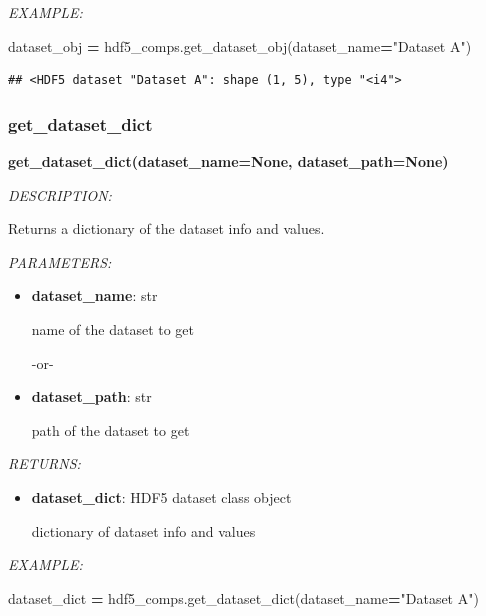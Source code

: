 \documentclass[
]{article}
\newenvironment{Shaded}{\begin{snugshade}}{\end{snugshade}}
\newcommand{\NormalTok}[1]{#1}
\newcommand{\OperatorTok}[1]{\textcolor[rgb]{0.81,0.36,0.00}{\textbf{#1}}}
\newcommand{\StringTok}[1]{\textcolor[rgb]{0.31,0.60,0.02}{#1}}
\begin{document}
\emph{EXAMPLE:}

\begin{Shaded}
\begin{Highlighting}[]
\NormalTok{dataset_obj }\OperatorTok{=}\NormalTok{ hdf5_comps.get_dataset_obj(dataset_name}\OperatorTok{=}\StringTok{"Dataset A"}\NormalTok{)}
\end{Highlighting}
\end{Shaded}

\begin{verbatim}
## <HDF5 dataset "Dataset A": shape (1, 5), type "<i4">
\end{verbatim}

\hypertarget{get_dataset_dict}{%
\subsubsection{get\_dataset\_dict}\label{get_dataset_dict}}

\textbf{get\_dataset\_dict(dataset\_name=None, dataset\_path=None)}

\emph{DESCRIPTION:}

Returns a dictionary of the dataset info and values.

\emph{PARAMETERS:}

\begin{itemize}
\item
  \textbf{dataset\_name}: str

  name of the dataset to get

  -or-
\item
  \textbf{dataset\_path}: str

  path of the dataset to get
\end{itemize}

\emph{RETURNS:}

\begin{itemize}
\item
  \textbf{dataset\_dict}: HDF5 dataset class object

  dictionary of dataset info and values
\end{itemize}

\emph{EXAMPLE:}

\begin{Shaded}
\begin{Highlighting}[]
\NormalTok{dataset_dict }\OperatorTok{=}\NormalTok{ hdf5_comps.get_dataset_dict(dataset_name}\OperatorTok{=}\StringTok{"Dataset A"}\NormalTok{)}
\end{Highlighting}
\end{Shaded}
\end{document}
